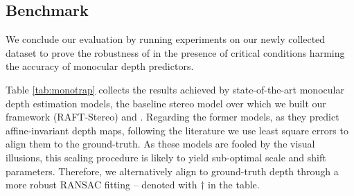 \begin{table}[t]
\centering
\renewcommand{\tabcolsep}{10pt}
\vspace{-0.2cm}
\caption{\textbf{\dataset Benchmark.} Comparison with state-of-the-art monocular depth estimation models and RAFT-Stereo. Both RAFT-Stereo and \method are trained on SceneFlow \cite{mayer2016large}. $\dagger$ refers to robust scaling through RANSAC.
}\vspace{-0.3cm}
\label{tab:monotrap}
\end{table}




\subsection{\dataset Benchmark}

We conclude our evaluation by running experiments on our newly collected \dataset dataset to prove the robustness of \method in the presence of critical conditions harming the accuracy of monocular depth predictors.

Table \ref{tab:monotrap} collects the results achieved by state-of-the-art monocular depth estimation models, the baseline stereo model over which we built our framework (RAFT-Stereo) and \method. Regarding the former models, as they predict affine-invariant depth maps, following the literature \cite{Ranftl2022} we use least square errors to align them to the ground-truth. As these models are fooled by the visual illusions, this scaling procedure is likely to yield sub-optimal scale and shift parameters. Therefore, we alternatively align to ground-truth depth through a more robust RANSAC fitting -- denoted with $\dagger$ in the table.

